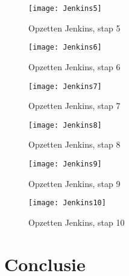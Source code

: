     \begin{figure}	
        \texttt{[image: Jenkins5]}
        \caption{Opzetten Jenkins, stap 5} \label{Jenkins5}
    \end{figure}
    
    \begin{figure}	
        \texttt{[image: Jenkins6]}
        \caption{Opzetten Jenkins, stap 6} \label{Jenkins6}
    \end{figure}

    \begin{figure}	
        \texttt{[image: Jenkins7]}
        \caption{Opzetten Jenkins, stap 7} \label{Jenkins7}
    \end{figure}
    
    \begin{figure}	
        \texttt{[image: Jenkins8]}
        \caption{Opzetten Jenkins, stap 8} \label{Jenkins8}
    \end{figure}
    
    \begin{figure}	
        \texttt{[image: Jenkins9]}
        \caption{Opzetten Jenkins, stap 9} \label{Jenkins9}
    \end{figure}
    
    \begin{figure}	
        \texttt{[image: Jenkins10]}
        \caption{Opzetten Jenkins, stap 10} \label{Jenkins10}
    \end{figure}
    
    
    
\section{Conclusie}
\label{sec:conclusie}
